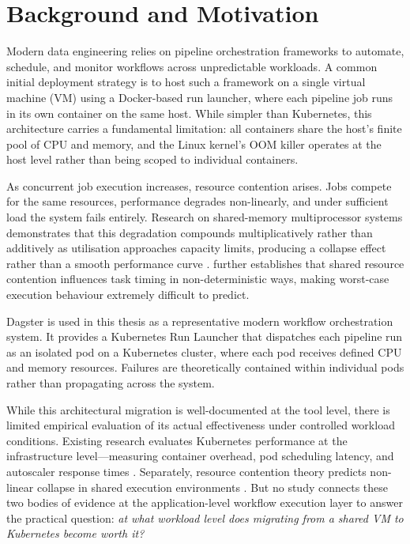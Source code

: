
\section{Background and Motivation}
\label{sec:background}

Modern data engineering relies on pipeline orchestration frameworks to automate, schedule, and monitor workflows across unpredictable workloads. A common initial deployment strategy is to host such a framework on a single virtual machine (VM) using a Docker-based run launcher, where each pipeline job runs in its own container on the same host. While simpler than Kubernetes, this architecture carries a fundamental limitation: all containers share the host's finite pool of CPU and memory, and the Linux kernel's OOM killer operates at the host level rather than being scoped to individual containers.

As concurrent job execution increases, resource contention arises. Jobs compete for the same resources, performance degrades non-linearly, and under sufficient load the system fails entirely. Research on shared-memory multiprocessor systems demonstrates that this degradation compounds multiplicatively rather than additively as utilisation approaches capacity limits, producing a collapse effect rather than a smooth performance curve \citep{nanda1991}. \citet{arora2023} further establishes that shared resource contention influences task timing in non-deterministic ways, making worst-case execution behaviour extremely difficult to predict.

Dagster is used in this thesis as a representative modern workflow orchestration system. It provides a Kubernetes Run Launcher that dispatches each pipeline run as an isolated pod on a Kubernetes cluster, where each pod receives defined CPU and memory resources. Failures are theoretically contained within individual pods rather than propagating across the system.

While this architectural migration is well-documented at the tool level, there is limited empirical evaluation of its actual effectiveness under controlled workload conditions. Existing research evaluates Kubernetes performance at the infrastructure level---measuring container overhead, pod scheduling latency, and autoscaler response times \citep{casalicchio2019, nguyen2020, choi2021}. Separately, resource contention theory predicts non-linear collapse in shared execution environments \citep{nanda1991, arora2023}. But no study connects these two bodies of evidence at the application-level workflow execution layer to answer the practical question: \emph{at what workload level does migrating from a shared VM to Kubernetes become worth it?}
